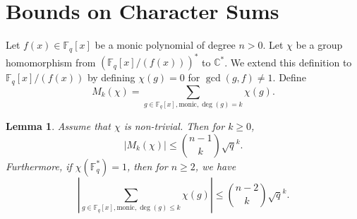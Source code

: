 \documentclass[reqno]{amsart}
\newtheorem{lem}[thm]{Lemma}
\theoremstyle{remark}
\numberwithin{equation}{section}
\newcommand{\f}{\mathbb{F}_q}
\begin{document}
\section{Bounds on Character Sums}


 Let $f(x)\in \f[x]$ be a monic polynomial of degree $n>0$.
 Let $\chi$ be a group homomorphism from $(\f[x]/(f(x)))^*$ to $\mathbb{C}^*$.
 We extend this definition to $\f[x]/(f(x))$ by defining $\chi(g)=0$ for $\gcd(g, f)\ne 1$.
 Define $$M_k(\chi)=\sum_{g\in\f[x], \text{monic}, \deg(g)=k} \chi(g).$$


 \begin{lem}\label{weil} Assume that $\chi$ is non-trivial.  Then for $k \geq 0$,
 $$|M_k(\chi)|\leq {n-1 \choose k} {\sqrt{q}}^k.$$
 Furthermore, if $\chi(\f^*)=1$, then for $n\geq 2$, we have
 $$\left| \sum_{g\in\f[x], \text{monic}, \deg(g)\leq k} \chi(g)\right|\leq {n-2 \choose k} {\sqrt{q}}^k.$$
 \end{lem}
\end{document}
